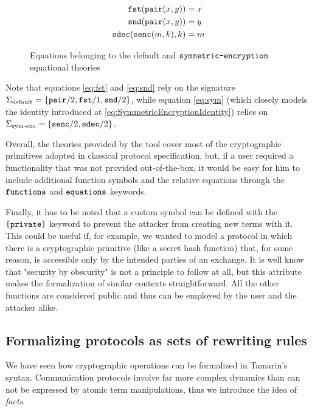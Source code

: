 \documentclass{article}
\newcommand{\mono}[1]{\textrm{\tt #1}}
\begin{document}
\begin{figure}
    \begin{align}
        \mono{fst}(\mono{pair}(x,y)) &= x \label{eq:fst}\\
        \mono{snd}(\mono{pair}(x,y)) &= y \label{eq:snd}\\
        \mono{sdec}(\mono{senc}(m, k), k) &= m \label{eq:sym}
    \end{align}
    \caption{Equations belonging to the default and $\mono{symmetric-encryption}$ equational theories}
\end{figure}

Note that equations \ref{eq:fst} and \ref{eq:snd} rely on the signature $\Sigma_\textrm{default} = \{\mono{pair}/2, \mono{fst}/1, \mono{snd}/2\}$, while equation \ref{eq:sym} (which closely models the identity introduced at \ref{eq:SymmetricEncryptionIdentity}) relies on $\Sigma_\textrm{sym-enc} = \{\mono{senc}/2, \mono{sdec}/2\}$. 

Overall, the theories provided by the tool cover most of the cryptographic primitives adopted in classical protocol specification, but, if a user required a functionality that was not provided out-of-the-box, it would be easy for him to include additional function symbols and the relative equations through the $\mono{functions}$ and $\mono{equations}$ keywords.

Finally, it has to be noted that a custom symbol can be defined with the $\mono{[private]}$ keyword to prevent the attacker from creating new terms with it. This could be useful if, for example, we wanted to model a protocol in which there is a cryptographic primitive (like a secret hash function) that, for some reason, is accessible only by the intended parties of an exchange. It is well know that "security by obscurity" is not a principle to follow at all, but this attribute makes the formalization of similar contexts straightforward. All the other functions are considered public and thus can be employed by the user and the attacker alike.

\subsection{Formalizing protocols as sets of rewriting rules}

We have seen how cryptographic operations can be formalized in Tamarin's syntax. Communication protocols involve far more complex dynamics than can not be expressed by atomic term manipulations, thus we introduce the idea of \textit{facts}.
\end{document}

